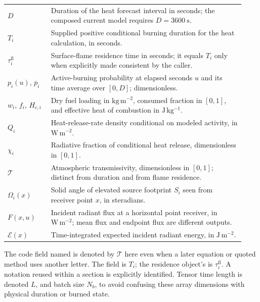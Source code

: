 \documentclass[11pt,a4paper]{article}
\begin{document}
\begin{longtable}{@{}P{0.17\linewidth}P{0.76\linewidth}@{}}
$D$ & Duration of the heat forecast interval in seconds; the composed current model requires $D=3600\ \mathrm{s}$.\\
$T_i$ & Supplied positive conditional burning duration for the heat calculation, in seconds.\\
$\tau_i^{\mathrm{fl}}$ & Surface-flame residence time in seconds; it equals $T_i$ only when explicitly made consistent by the caller.\\
$p_i(u)$, $\overline p_i$ & Active-burning probability at elapsed seconds $u$ and its time average over $[0,D]$; dimensionless.\\
$w_i$, $f_i$, $H_{c,i}$ & Dry fuel loading in $\mathrm{kg\,m^{-2}}$, consumed fraction in $[0,1]$, and effective heat of combustion in $\mathrm{J\,kg^{-1}}$.\\
$Q_i$ & Heat-release-rate density conditional on modeled activity, in $\mathrm{W\,m^{-2}}$.\\
$\chi_i$ & Radiative fraction of conditional heat release, dimensionless in $[0,1]$.\\
$\mathcal T$ & Atmospheric transmissivity, dimensionless in $[0,1]$; distinct from duration and from flame residence.\\
$\Omega_i(x)$ & Solid angle of elevated source footprint $S_i$ seen from receiver point $x$, in steradians.\\
$F(x,u)$ & Incident radiant flux at a horizontal point receiver, in $\mathrm{W\,m^{-2}}$; mean flux and endpoint flux are different outputs.\\
$\mathcal E(x)$ & Time-integrated expected incident radiant energy, in $\mathrm{J\,m^{-2}}$.\\
\bottomrule
\end{longtable}

The code field named  is denoted by
$\mathcal T$ here even when a later equation or quoted method uses another
letter. The field  is $T_i$; the residence object's
 is $\tau_i^{\mathrm{fl}}$. A notation reused within a section
is explicitly identified. Tensor time length is denoted $L$, and batch size
$N_b$, to avoid confusing these array dimensions with physical duration or
burned state.
\end{document}
